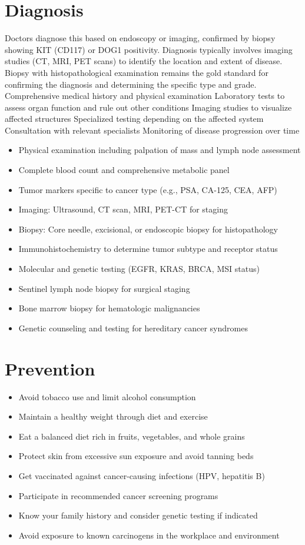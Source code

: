 \section{Diagnosis}
Doctors diagnose this based on endoscopy or imaging, confirmed by biopsy showing KIT (CD117) or DOG1 positivity. Diagnosis typically involves imaging studies (CT, MRI, PET scans) to identify the location and extent of disease. Biopsy with histopathological examination remains the gold standard for confirming the diagnosis and determining the specific type and grade. Comprehensive medical history and physical examination Laboratory tests to assess organ function and rule out other conditions Imaging studies to visualize affected structures Specialized testing depending on the affected system Consultation with relevant specialists Monitoring of disease progression over time

\begin{itemize}[noitemsep]
  \item Physical examination including palpation of mass and lymph node assessment
  \item Complete blood count and comprehensive metabolic panel
  \item Tumor markers specific to cancer type (e.g., PSA, CA-125, CEA, AFP)
  \item Imaging: Ultrasound, CT scan, MRI, PET-CT for staging
  \item Biopsy: Core needle, excisional, or endoscopic biopsy for histopathology
  \item Immunohistochemistry to determine tumor subtype and receptor status
  \item Molecular and genetic testing (EGFR, KRAS, BRCA, MSI status)
  \item Sentinel lymph node biopsy for surgical staging
  \item Bone marrow biopsy for hematologic malignancies
  \item Genetic counseling and testing for hereditary cancer syndromes
\end{itemize}
\section{Prevention}
\begin{itemize}[noitemsep]
  \item Avoid tobacco use and limit alcohol consumption
  \item Maintain a healthy weight through diet and exercise
  \item Eat a balanced diet rich in fruits, vegetables, and whole grains
  \item Protect skin from excessive sun exposure and avoid tanning beds
  \item Get vaccinated against cancer-causing infections (HPV, hepatitis B)
  \item Participate in recommended cancer screening programs
  \item Know your family history and consider genetic testing if indicated
  \item Avoid exposure to known carcinogens in the workplace and environment
\end{itemize}

